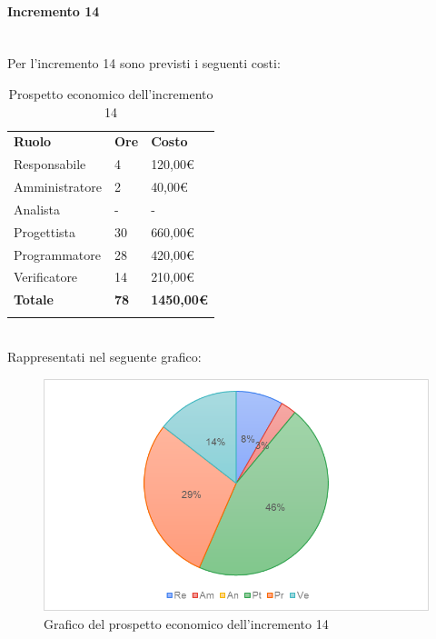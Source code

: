 \paragraph{Incremento 14} \mbox{} \\
Per l'incremento 14 sono previsti i seguenti costi:
\begin{longtable} {
		>{}p{32mm}
		>{}p{20mm}
		>{}p{20mm}
	}
	\rowcolor{gray!50}
	
	\textbf{Ruolo} & \textbf{Ore} & \textbf{Costo} \TBstrut \\
	Responsabile & 4 & 120,00\euro{} \TBstrut \\
	Amministratore & 2 & 40,00\euro{} \TBstrut \\
	Analista & - & - \TBstrut \\
	Progettista & 30 & 660,00\euro{}\TBstrut \\
	Programmatore & 28 & 420,00\euro{} \TBstrut \\
	Verificatore & 14 & 210,00\euro{} \TBstrut \\
	\textbf{Totale} & \textbf{78}& \textbf{1450,00\euro{}} \TBstrut \\	
	\rowcolor{white}
	\caption{Prospetto economico dell'incremento 14}
\end{longtable} \mbox{} \\
Rappresentati nel seguente grafico: \mbox{}
\begin{figure} [H]
	\includegraphics[width=\linewidth]{./img/Grafici/27.png}
	\caption{Grafico del prospetto economico dell'incremento 14}
\end{figure}

